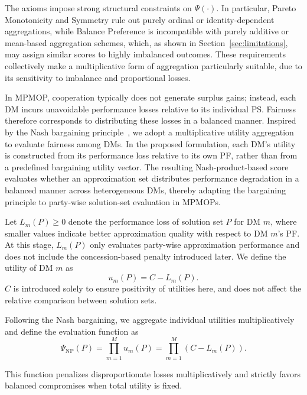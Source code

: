 \documentclass[journal]{IEEEtran}
\begin{document}
The axioms impose strong structural constraints on $\Psi(\cdot)$. In particular, Pareto Monotonicity and Symmetry rule out purely ordinal or identity-dependent aggregations, while Balance Preference is incompatible with purely additive or mean-based aggregation schemes, which, as shown in Section~\ref{sec:limitations}, may assign similar scores to highly imbalanced outcomes. These requirements collectively make a multiplicative form of aggregation particularly suitable, due to its sensitivity to imbalance and proportional losses.

In MPMOP, cooperation typically does not generate surplus gains; instead, each DM incurs unavoidable performance losses relative to its individual PS. Fairness therefore corresponds to distributing these losses in a balanced manner. Inspired by the Nash bargaining principle~\cite{nash1950bargaining}, we adopt a multiplicative utility aggregation to evaluate fairness among DMs. In the proposed formulation, each DM's utility is constructed from its performance loss relative to its own PF, rather than from a predefined bargaining utility vector. The resulting Nash-product-based score evaluates whether an approximation set distributes performance degradation in a balanced manner across heterogeneous DMs, thereby adapting the bargaining principle to party-wise solution-set evaluation in MPMOPs.

Let $L_m(P) \ge 0$ denote the performance loss of solution set $P$ for DM $m$, where smaller values indicate better approximation quality with respect to DM $m$'s PF. At this stage, $L_m(P)$ only evaluates party-wise approximation performance and does not include the concession-based penalty introduced later. We define the utility of DM $m$ as
\begin{equation}
	u_m(P) = C -L_m(P).
\end{equation}
$C$ is introduced solely to ensure positivity of utilities here, and does not affect the relative comparison between solution sets.

Following the Nash bargaining, we aggregate individual utilities multiplicatively and define the evaluation function as
\begin{equation}
	\Psi_\mathrm{NP}(P) = \prod_{m=1}^M u_m(P) = \prod_{m=1}^M \left( C -L_m(P)\right).
\end{equation}

This function penalizes disproportionate losses multiplicatively and strictly favors balanced compromises when total utility is fixed.
\end{document}
